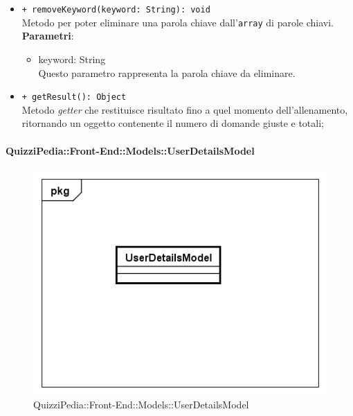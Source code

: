 \begin{itemize}
\begin{itemize}
				\item \texttt{+ removeKeyword(keyword: String): void} \\
				Metodo per poter eliminare una parola chiave dall'\texttt{array} di parole chiavi.\\
				\textbf{Parametri}:
				\begin{itemize}
					\item {keyword: String}\\
					Questo parametro rappresenta la parola chiave da eliminare.
				\end{itemize}
				
				\item \texttt{+ getResult(): Object} \\
				Metodo \textit{getter} che restituisce risultato fino a quel momento dell'allenamento, ritornando un oggetto contenente il numero di domande giuste e totali;
				
			\end{itemize}
		\end{itemize}
			
		\paragraph{QuizziPedia::Front-End::Models::UserDetailsModel}
		
		\label{QuizziPedia::Front-End::Models:.UserDetailsModel}
		
		\begin{figure}[ht]
			\centering
			\includegraphics[scale=0.5,keepaspectratio]{UML/Classi/Front-End/QuizziPedia_Front-end_Models_UserDetailsModel.png}
			\caption{QuizziPedia::Front-End::Models::UserDetailsModel}
		\end{figure} \FloatBarrier
		
